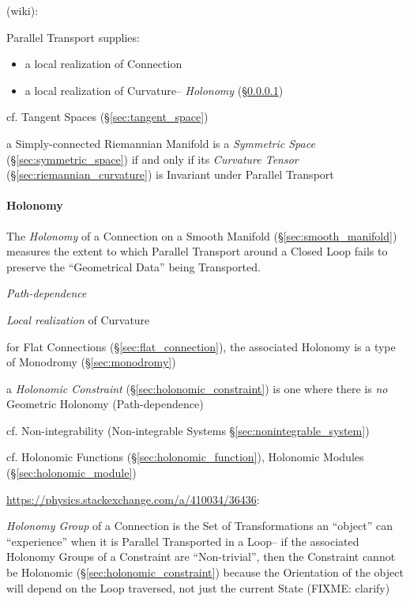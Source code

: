 (wiki):

Parallel Transport supplies:
\begin{itemize}
  \item a local realization of Connection
  \item a local realization of Curvature-- \emph{Holonomy}
    (\S\ref{sec:holonomy})
\end{itemize}

\fist cf. Tangent Spaces (\S\ref{sec:tangent_space})

a Simply-connected Riemannian Manifold is a \emph{Symmetric Space}
(\S\ref{sec:symmetric_space}) if and only if its \emph{Curvature Tensor}
(\S\ref{sec:riemannian_curvature}) is Invariant under Parallel Transport



\paragraph{Holonomy}\label{sec:holonomy}\hfill

The \emph{Holonomy} of a Connection on a Smooth Manifold
(\S\ref{sec:smooth_manifold}) measures the extent to which Parallel Transport
around a Closed Loop fails to preserve the ``Geometrical Data'' being
Transported.

\emph{Path-dependence}

\emph{Local realization} of Curvature

for Flat Connections (\S\ref{sec:flat_connection}), the associated Holonomy is
a type of Monodromy (\S\ref{sec:monodromy})

a \emph{Holonomic Constraint} (\S\ref{sec:holonomic_constraint}) is one where
there is \emph{no} Geometric Holonomy (Path-dependence)

cf. Non-integrability (Non-integrable Systems \S\ref{sec:nonintegrable_system})

\fist cf. Holonomic Functions (\S\ref{sec:holonomic_function}), Holonomic
Modules (\S\ref{sec:holonomic_module})

\url{https://physics.stackexchange.com/a/410034/36436}:

\emph{Holonomy Group} of a Connection is the Set of Transformations an
``object'' can ``experience'' when it is Parallel Transported in a Loop-- if
the associated Holonomy Groups of a Constraint are ``Non-trivial'', then the
Constraint cannot be Holonomic (\S\ref{sec:holonomic_constraint}) because the
Orientation of the object will depend on the Loop traversed, not just the
current State (FIXME: clarify)



